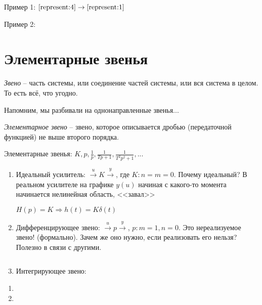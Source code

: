 \documentclass[main.tex]{subfiles}
\begin{document}
Пример 1: $ \ref{represent:4} \to \ref{represent:1} $ %

Пример 2:



\section{Элементарные звенья}

\emph{Звено} -- часть системы, или соединение частей системы, или вся система в целом.
То есть всё, что угодно.

Напомним, мы разбивали на однонаправленные звенья...

\emph{Элементарное звено} -- звено, которое описывается дробью (передаточной функцией) не выше второго порядка.

Элементарные звенья: $ K, p, \frac{1}{p}, \frac{1}{Tp+1}, \frac{1}{T^2p^2 + 1}, ... $

\begin{enumerate}[noitemsep]
	\item Идеальный усилитель: $ \xrightarrow{u} \boxed{K} \xrightarrow{y} $, где $ K: n=m=0 $.
	Почему идеальный? В реальном усилителе на графике $ y(u) $ начиная с какого-то момента начинается нелинейная область, <<завал>>

	$ H(p) = K \Rightarrow h(t) = K \delta(t) $

	\item Дифференцирующее звено: $ \xrightarrow{u} \boxed{p} \xrightarrow{y} $, $ p: m=1, n=0 $. Это нереализуемое звено! (формально).
	Зачем же оно нужно, если реализовать его нельзя?
	Полезно в связи с другими.

	$  $ %

	\item Интегрирующее звено:
\end{enumerate}

\begin{enumerate}[noitemsep]
	\item
	\item
\end{enumerate}
\end{document}
